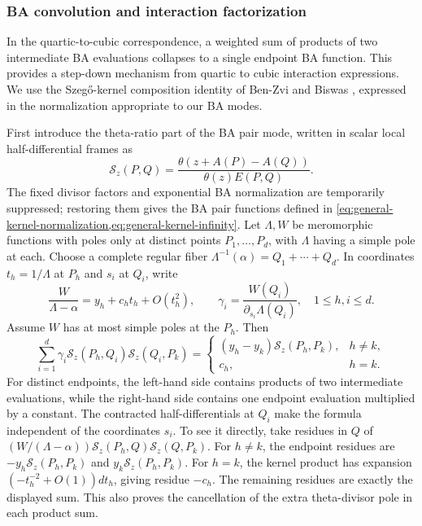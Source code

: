 \subsubsection{BA convolution and interaction factorization}

In the quartic-to-cubic correspondence, a weighted sum of products of
two intermediate BA evaluations collapses to a single endpoint BA
function. This
provides a step-down mechanism from quartic to cubic interaction
expressions. We use the Szeg\H{o}-kernel composition identity of
Ben-Zvi and Biswas \cite[Proposition~5.2.1]{BenZviBiswas2003},
expressed in the normalization appropriate to our BA modes.

First introduce the theta-ratio part of the BA pair mode,
written in scalar local half-differential frames as
\begin{equation}\label{eq:AHH-Szego}
 \mathscr S_z(P,Q)=
 \frac{\theta(z+A(P)-A(Q))}{\theta(z)E(P,Q)}.
\end{equation}
The fixed divisor factors and exponential BA normalization are
temporarily suppressed; restoring them gives the BA pair functions
defined in \cref{eq:general-kernel-normalization,eq:general-kernel-infinity}.
Let $\Lambda,W$ be meromorphic functions
with poles only at distinct points $P_1,\ldots,P_d$, with $\Lambda$
having a simple pole at each. Choose a complete regular fiber
$\Lambda^{-1}(\alpha)=Q_1+\cdots+Q_d$. In coordinates
$t_h=1/\Lambda$ at $P_h$ and $s_i$ at $Q_i$, write
\begin{equation}\label{eq:AHH-fiber-data}
 \frac{W}{\Lambda-\alpha}
       =y_h+c_ht_h+O(t_h^2),\qquad
 \gamma_i=\frac{W(Q_i)}{\partial_{s_i}\Lambda(Q_i)},
 \quad 1\leq h,i\leq d.
\end{equation}
Assume $W$ has at most simple poles at the $P_h$. Then
\begin{equation}\label{eq:AHH-fiber-convolution}
 \sum_{i=1}^{d}\gamma_i
      \mathscr S_z(P_h,Q_i)\mathscr S_z(Q_i,P_k)
 =\begin{cases}
 (y_h-y_k)\mathscr S_z(P_h,P_k),&h\ne k,\\
 c_h,&h=k.
 \end{cases}
\end{equation}
For distinct endpoints, the left-hand side contains products of two
intermediate evaluations, while the right-hand side contains one
endpoint evaluation multiplied by a constant.
The contracted half-differentials at $Q_i$ make the formula independent
of the coordinates $s_i$. To see it directly, take residues in $Q$
of $(W/(\Lambda-\alpha))\mathscr S_z(P_h,Q)
\mathscr S_z(Q,P_k)$. For $h\ne k$, the endpoint residues are
$-y_h\mathscr S_z(P_h,P_k)$ and
$y_k\mathscr S_z(P_h,P_k)$. For $h=k$, the kernel product has
expansion $(-t_h^{-2}+O(1))dt_h$, giving residue $-c_h$.
The remaining residues are exactly the displayed sum. This also
proves the cancellation of the extra theta-divisor pole in each
product sum.


